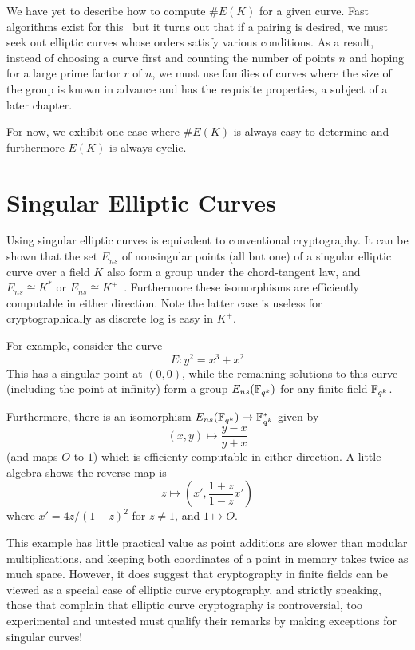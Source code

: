 We have yet to describe how to compute $\#E(K)$ for a given curve.
Fast algorithms exist for this~\cite{bss}
but it turns out that if a pairing is desired, we must seek out
elliptic curves whose orders satisfy various conditions.
As a result,
instead of choosing a curve first and counting the number of points $n$ and
hoping for a large prime factor $r$ of $n$,
we must use families of curves where the size of the group
is known in advance and has the requisite properties,
a subject of a later chapter.

For now, we exhibit one case where $\#E(K)$ is always easy to determine
and furthermore $E(K)$ is always cyclic.

\section {\label{sec:singular}Singular Elliptic Curves}

Using singular elliptic curves is equivalent to conventional cryptography.
It can be shown that the set $E_{ns}$ of nonsingular points (all but one) of a
singular elliptic curve over a field $K$ also form a group under the
chord-tangent law, and $E_{ns} \cong K^*$ or
$E_{ns} \cong K^+$~\cite[Proposition 2.5]{silverman}. Furthermore these
isomorphisms are efficiently computable in either direction. Note the latter
case is useless for cryptographically as discrete log is easy in $K^+$.

For example, consider the curve
\[ E : y^2 = x^3 + x^2 \]
This has a singular point at $(0,0)$, while the remaining solutions to this
curve (including the point at infinity) form a group $E_{ns}(\mathbb{F}_{q^k})$ for any
finite field $\mathbb{F}_{q^k}$.

Furthermore, there is an isomorphism $E_{ns}(\mathbb{F}_{q^k}) \rightarrow \mathbb{F}_{q^k}^*$
given by
\[ (x,y) \mapsto \frac{y-x}{y+x} \]
(and maps $O$ to $1$)
which is efficienty computable in either direction.
A little algebra
shows the reverse map is
\[ z \mapsto \left( x', \frac{1+z}{1-z} x' \right) \]
where $x' = 4z/(1-z)^2$ for $z \ne 1$, and $1 \mapsto O$.

This example has little practical value as point additions are slower than
modular multiplications, and keeping both coordinates of a point in memory
takes twice as much space. However, it does suggest that cryptography in finite
fields can be viewed as a special case of elliptic curve cryptography, and
strictly speaking, those that complain that elliptic curve cryptography is
controversial, too experimental and untested must qualify their remarks by
making exceptions for singular curves!

